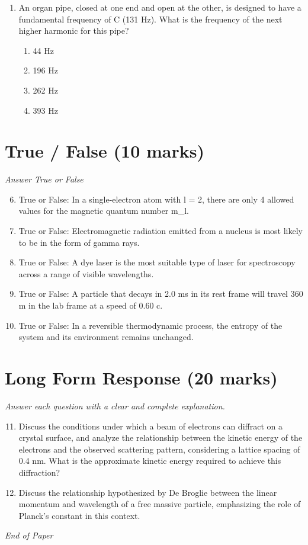 \documentclass[12pt]{article}
\begin{document}
\begin{enumerate}[label=\arabic*.]
\begin{enumerate}[label=(\alph*)]
    \item Adiabatic
\end{enumerate}
\item An organ pipe, closed at one end and open at the other, is designed to have a fundamental frequency of C (131 Hz). What is the frequency of the next higher harmonic for this pipe?
\begin{enumerate}[label=(\alph*)]
    \item 44 Hz
    \item 196 Hz
    \item 262 Hz
    \item 393 Hz
\end{enumerate}
\end{enumerate}

\section*{True / False (10 marks)}
\textit{Answer True or False}
\begin{enumerate}[label=\arabic*.]
\setcounter{enumi}{5}
\item True or False: In a single-electron atom with l = 2, there are only 4 allowed values for the magnetic quantum number m\_l.
\item True or False: Electromagnetic radiation emitted from a nucleus is most likely to be in the form of gamma rays.
\item True or False: A dye laser is the most suitable type of laser for spectroscopy across a range of visible wavelengths.
\item True or False: A particle that decays in 2.0 ms in its rest frame will travel 360 m in the lab frame at a speed of 0.60 c.
\item True or False: In a reversible thermodynamic process, the entropy of the system and its environment remains unchanged.
\end{enumerate}

\section*{Long Form Response (20 marks)}
\textit{Answer each question with a clear and complete explanation.}
\begin{enumerate}[label=\arabic*.]
\setcounter{enumi}{10}
\item Discuss the conditions under which a beam of electrons can diffract on a crystal surface, and analyze the relationship between the kinetic energy of the electrons and the observed scattering pattern, considering a lattice spacing of 0.4 nm. What is the approximate kinetic energy required to achieve this diffraction?
\item Discuss the relationship hypothesized by De Broglie between the linear momentum and wavelength of a free massive particle, emphasizing the role of Planck's constant in this context.
\end{enumerate}

\vfill
\noindent\textit{End of Paper}
\end{document}
